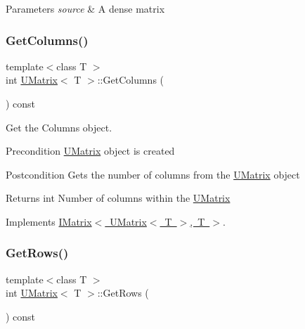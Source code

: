 \begin{DoxyParams}{Parameters}
{\em source} & A dense matrix \\
\hline
\end{DoxyParams}
\mbox{\label{class_u_matrix_a4065961abb79fd43d7abaf10c47e73d8}} 
\subsubsection{\texorpdfstring{GetColumns()}{GetColumns()}}
{\footnotesize\ttfamily template$<$class T $>$ \\
int \mbox{\hyperlink{class_u_matrix}{U\+Matrix}}$<$ T $>$\+::Get\+Columns (\begin{DoxyParamCaption}{ }\end{DoxyParamCaption}) const\hspace{0.3cm}{\ttfamily [virtual]}}



Get the Columns object. 

\begin{DoxyPrecond}{Precondition}
\mbox{\hyperlink{class_u_matrix}{U\+Matrix}} object is created 
\end{DoxyPrecond}
\begin{DoxyPostcond}{Postcondition}
Gets the number of columns from the \mbox{\hyperlink{class_u_matrix}{U\+Matrix}} object 
\end{DoxyPostcond}
\begin{DoxyReturn}{Returns}
int Number of columns within the \mbox{\hyperlink{class_u_matrix}{U\+Matrix}} 
\end{DoxyReturn}


Implements \mbox{\hyperlink{class_i_matrix_a3b84da3898ef38bdf281c13f218fc278}{I\+Matrix$<$ U\+Matrix$<$ T $>$, T $>$}}.

\mbox{\label{class_u_matrix_ae261286236cb23a0dfa1296591f4c3ad}} 
\subsubsection{\texorpdfstring{GetRows()}{GetRows()}}
{\footnotesize\ttfamily template$<$class T $>$ \\
int \mbox{\hyperlink{class_u_matrix}{U\+Matrix}}$<$ T $>$\+::Get\+Rows (\begin{DoxyParamCaption}{ }\end{DoxyParamCaption}) const\hspace{0.3cm}{\ttfamily [virtual]}}



